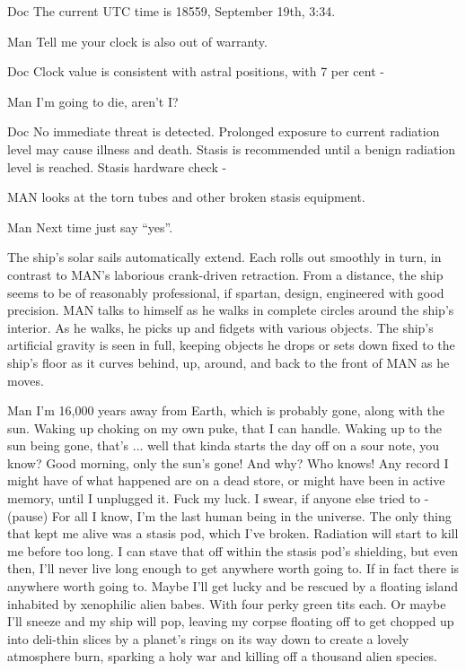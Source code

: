 \documentclass{screenplay}
\begin{document}
\begin{dialogue}{Doc}
The current UTC time is 18559, September 19th, 3:34.
\end{dialogue}
\begin{dialogue}{Man}
Tell me your clock is also out of warranty.
\end{dialogue}
\begin{dialogue}{Doc}
Clock value is consistent with astral positions, with 7 per cent -
\end{dialogue}
\begin{dialogue}[interrupting]{Man}
I'm going to die, aren't I?
\end{dialogue}
\begin{dialogue}{Doc}
No immediate threat is detected.  Prolonged exposure to current radiation level may cause illness and death.  Stasis is recommended until a benign radiation level is reached.  Stasis hardware check -
\end{dialogue}
MAN looks at the torn tubes and other broken stasis equipment.
\begin{dialogue}[interrupting]{Man}
Next time just say ``yes''.
\end{dialogue}
The ship's solar sails automatically extend.  Each rolls out smoothly in turn, in contrast to MAN's laborious crank-driven retraction.  From a distance, the ship seems to be of reasonably professional, if spartan, design, engineered with good precision.
MAN talks to himself as he walks in complete circles around the ship's interior.  As he walks, he picks up and fidgets with various objects.  The ship's artificial gravity is seen in full, keeping objects he drops or sets down fixed to the ship's floor as it curves behind, up, around, and back to the front of MAN as he moves.
\begin{dialogue}[to himself]{Man}
I'm 16,000 years away from Earth, which is probably gone, along with the sun.  Waking up choking on my own puke, that I can handle.  Waking up to the sun being gone, that's ... well that kinda starts the day off on a sour note, you know?  Good morning, only the sun's gone!  And why?  Who knows!  Any record I might have of what happened are on a dead store, or might have been in active memory, until I unplugged it.  Fuck my luck.  I swear, if anyone else tried to - (pause) For all I know, I'm the last human being in the universe.  The only thing that kept me alive was a stasis pod, which I've broken.  Radiation will start to kill me before too long.  I can stave that off within the stasis pod's shielding, but even then, I'll never live long enough to get anywhere worth going to.  If in fact there is anywhere worth going to.  Maybe I'll get lucky and be rescued by a floating island inhabited by xenophilic alien babes.  With four perky green tits each.  Or maybe I'll sneeze and my ship will pop, leaving my corpse floating off to get chopped up into deli-thin slices by a planet's rings on its way down to create a lovely atmosphere burn, sparking a holy war and killing off a thousand alien species.
\end{dialogue}
\end{document}
